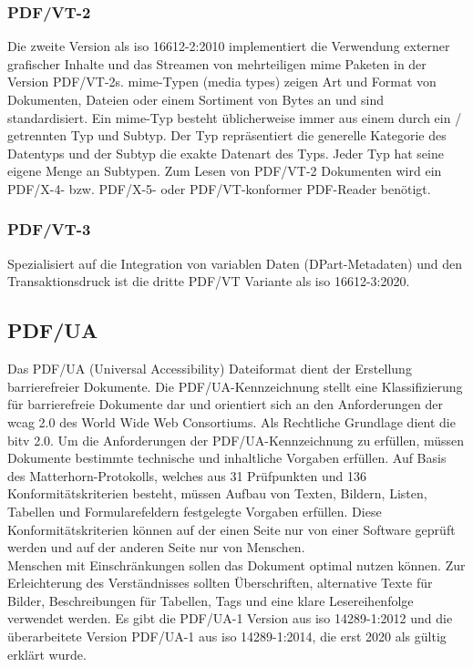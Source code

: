 \subsubsection{PDF/VT-2}
Die zweite Version als \gls{iso} 16612-2:2010 implementiert die Verwendung externer grafischer Inhalte und das Streamen von mehrteiligen \gls{mime} Paketen in der Version PDF/VT-2s. \gls{mime}-Typen (media types) zeigen Art und Format von Dokumenten, Dateien oder einem Sortiment von Bytes an und sind standardisiert. Ein \gls{mime}-Typ besteht üblicherweise immer aus einem durch ein / getrennten Typ und Subtyp. Der Typ repräsentiert die generelle Kategorie des Datentyps und der Subtyp die exakte Datenart des Typs. Jeder Typ hat seine eigene Menge an Subtypen. \cite{mime} Zum Lesen von PDF/VT-2 Dokumenten wird ein PDF/X-4- bzw. PDF/X-5- oder PDF/VT-konformer PDF-Reader benötigt. \cite{proj-consult}

\subsubsection{PDF/VT-3}
Spezialisiert auf die Integration von variablen Daten (DPart-Metadaten) und den Transaktionsdruck ist die dritte PDF/VT Variante als \gls{iso} 16612-3:2020. \cite{proj-consult}


\subsection{PDF/UA}
Das PDF/UA (Universal Accessibility) Dateiformat dient der Erstellung barrierefreier Dokumente. Die PDF/UA-Kennzeichnung stellt eine Klassifizierung für barrierefreie Dokumente dar und orientiert sich an den Anforderungen der \gls{wcag} 2.0 des World Wide Web Consortiums. Als Rechtliche Grundlage dient die \gls{bitv} 2.0. Um die Anforderungen der PDF/UA-Kennzeichnung zu erfüllen, müssen Dokumente bestimmte technische und inhaltliche Vorgaben erfüllen. Auf Basis des Matterhorn-Protokolls, welches aus 31 Prüfpunkten und 136 Konformitätskriterien besteht, müssen Aufbau von Texten, Bildern, Listen, Tabellen und Formularefeldern festgelegte Vorgaben erfüllen. Diese Konformitätskriterien können auf der einen Seite nur von einer Software geprüft werden und auf der anderen Seite nur von Menschen. \\ Menschen mit Einschränkungen sollen das Dokument optimal nutzen können. Zur Erleichterung des Verständnisses sollten Überschriften, alternative Texte für Bilder, Beschreibungen für Tabellen, Tags und eine klare Lesereihenfolge verwendet werden. \cite{adobe-pdf-ua} Es gibt die PDF/UA-1 Version aus \gls{iso} 14289-1:2012 und die überarbeitete Version PDF/UA-1 aus \gls{iso} 14289-1:2014, die erst 2020 als gültig erklärt wurde. \cite{proj-consult}


